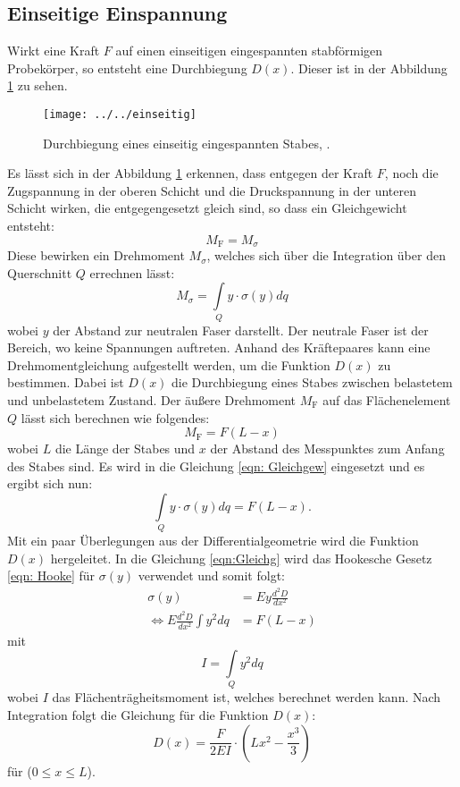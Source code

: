 \subsection{Einseitige Einspannung}
Wirkt eine Kraft $F$ auf einen einseitigen eingespannten stabförmigen Probekörper, so entsteht eine Durchbiegung $D(x)$. Dieser ist in der Abbildung \ref{fig:einseitig} zu sehen. 
\begin{figure}[h!]
	\centering
	\texttt{[image: ../../einseitig]}
	\caption{Durchbiegung eines einseitig eingespannten Stabes, \cite[2]{anleitung103}.}
	\label{fig:einseitig}
\end{figure}
Es lässt sich in der Abbildung \ref{fig:einseitig} erkennen, dass entgegen der Kraft $F$, noch die Zugspannung in der oberen Schicht und die Druckspannung in der unteren Schicht wirken, die entgegengesetzt gleich sind, so dass ein Gleichgewicht entsteht:
\begin{equation}
\label{eqn: Gleichgew}
M_\text{F} = M_{\sigma}
\end{equation}
Diese bewirken ein Drehmoment $M_{\sigma}$, welches sich über die Integration über den Querschnitt $Q$ errechnen lässt:
\begin{equation}
\label{eqn: Msigma}
M_{\sigma} = \int\limits_Q y \cdot \sigma(y) dq
\end{equation}
wobei $y$ der Abstand zur neutralen Faser darstellt. Der neutrale Faser ist der Bereich, wo keine Spannungen auftreten.
Anhand des Kräftepaares kann eine Drehmomentgleichung aufgestellt werden, um die Funktion $D(x)$ zu bestimmen. Dabei ist $D(x)$ die Durchbiegung eines Stabes zwischen belastetem und unbelastetem Zustand. 
Der äußere Drehmoment $M_\text{F}$ auf das Flächenelement $Q$ lässt sich berechnen wie folgendes:
\begin{equation}
M_\text{F} = F(L-x)
\end{equation}
wobei $L$ die Länge der Stabes und $x$ der Abstand des Messpunktes zum Anfang des Stabes sind.
Es wird in die Gleichung \ref{eqn: Gleichgew} eingesetzt und es ergibt sich nun: 
\begin{equation}
\label{eqn:Gleichg}
\int\limits_Q y \cdot \sigma(y) dq = F(L-x).
\end{equation}
Mit ein paar Überlegungen aus der Differentialgeometrie wird die Funktion $D(x)$ hergeleitet. In die Gleichung \ref{eqn:Gleichg} wird das Hookesche Gesetz \ref{eqn: Hooke} für $\sigma(y)$ verwendet und somit folgt:
\begin{align*}
\sigma(y) &= Ey \frac{d^2 D}{dx^2} \\
\Longleftrightarrow E \frac{d^2 D}{dx^2} \int y^2 dq &= F(L-x) 
\end{align*}
mit
\begin{equation}
\label{eqn: flächenträgheitsmoment}
I = \int\limits_Q y^2 dq
\end{equation}
wobei $I$ das Flächenträgheitsmoment ist, welches berechnet werden kann. Nach Integration folgt die Gleichung für die Funktion $D(x)$:
\begin{equation}
D(x) = \frac{F}{2 E I} \cdot (Lx^2 - \frac{x^3}{3})
\end{equation}
für ($0 \leq x \leq L$).

